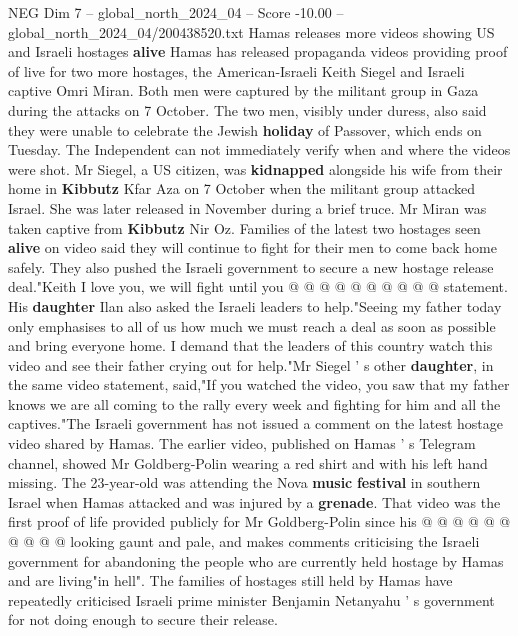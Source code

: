 \begin{textsample}{NEG Dim 7 – global\_north\_2024\_04 – Score -10.00 – global\_north\_2024\_04/200438520.txt}  \label{ex:f7_neg_223}
Hamas releases more videos showing US and Israeli hostages \textbf{alive} Hamas has released propaganda videos providing proof of live for two more hostages, the American-Israeli Keith Siegel and Israeli captive Omri Miran.
Both men were captured by the militant group in Gaza during the attacks on 7 October.
The two men, visibly under duress, also said they were unable to celebrate the Jewish \textbf{holiday} of Passover, which ends on Tuesday.
The Independent can not immediately verify when and where the videos were shot.
Mr Siegel, a US citizen, was \textbf{kidnapped} alongside his wife from their home in \textbf{Kibbutz} Kfar Aza on 7 October when the militant group attacked Israel.
She was later released in November during a brief truce.
Mr Miran was taken captive from \textbf{Kibbutz} Nir Oz.
Families of the latest two hostages seen \textbf{alive} on video said they will continue to fight for their men to come back home safely.
They also pushed the Israeli government to secure a new hostage release deal."Keith I love you, we will fight until you @ @ @ @ @ @ @ @ @ @ statement.
His \textbf{daughter} Ilan also asked the Israeli leaders to help."Seeing my father today only emphasises to all of us how much we must reach a deal as soon as possible and bring everyone home.
I demand that the leaders of this country watch this video and see their father crying out for help."Mr Siegel ' s other \textbf{daughter}, in the same video statement, said,"If you watched the video, you saw that my father knows we are all coming to the rally every week and fighting for him and all the captives."The Israeli government has not issued a comment on the latest hostage video shared by Hamas.
The earlier video, published on Hamas ' s Telegram channel, showed Mr Goldberg-Polin wearing a red shirt and with his left hand missing.
The 23-year-old was attending the Nova \textbf{music} \textbf{festival} in southern Israel when Hamas attacked and was injured by a \textbf{grenade}.
That video was the first proof of life provided publicly for Mr Goldberg-Polin since his @ @ @ @ @ @ @ @ @ @ looking gaunt and pale, and makes comments criticising the Israeli government for abandoning the people who are currently held hostage by Hamas and are living"in hell".
The families of hostages still held by Hamas have repeatedly criticised Israeli prime minister Benjamin Netanyahu ' s government for not doing enough to secure their release.

\end{textsample}
